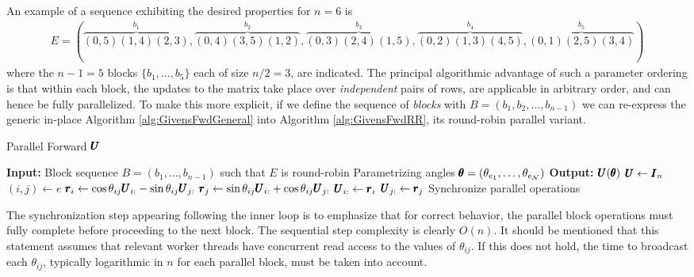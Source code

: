 \documentclass[superscriptaddress,floatfix]{article}
\begin{document}
An example of a sequence exhibiting the desired properties for $n=6$ is
\begin{align}
  E = ( \overbrace{ (0,5) (1,4) (2,3) }^{b_1}, \overbrace{ (0,4) (3,5) (1,2)}^{b_2}, \overbrace{ (0,3) (2,4) (1,5) }^{b_3}, \overbrace{ (0,2) (1,3) (4,5) }^{b_4},
  \overbrace{ (0,1) (2,5) (3,4) }^{b_5} )
  \label{eq:exampleRRSeq}
\end{align}
where the $n-1=5$ blocks $\{ b_1, \ldots, b_5 \}$ each of size
$n/2=3$, are indicated. The principal algorithmic advantage of such a
parameter ordering is that within each block, the updates to the
matrix take place over \emph{independent} pairs of rows, are
applicable in arbitrary order, and can hence be fully parallelized. To
make this more explicit, if we define the sequence of \emph{blocks}
with $B = (b_1, b_2, \ldots, b_{n-1} )$ we can re-express the generic
in-place Algorithm \ref{alg:GivensFwdGeneral} into Algorithm
\ref{alg:GivensFwdRR}, its round-robin parallel variant.
\begin{algorithm}[H]
  \caption{Parallel Forward ${\pmb{U}}$}
  \label{alg:GivensFwdRR}
  \begin{algorithmic}[0] %
    \State \textbf{Input:}
    \State \hspace*{\algorithmicindent} Block sequence $B = ( b_1,
    \ldots, b_{n-1})$ such that $E$ is round-robin
    \State \hspace*{\algorithmicindent} Parametrizing angles ${\pmb{\theta}} = (\theta_{e_1}, \ldots, \theta_{e_{\mathcal{N}}})$
    \State \textbf{Output:}
    \State \hspace*{\algorithmicindent} ${\pmb{U}}({\pmb{\theta}})$
    \State ${\pmb{U}} \gets {\pmb{I}}_n$
       
        \State $(i,j) \gets e$
        \State ${\pmb{r}}_i \gets \cos\theta_{ij}{\pmb{U}}_{i:} -
        \sin\theta_{ij}{\pmb{U}}_{j:}$
        \State ${\pmb{r}}_j \gets \sin\theta_{ij}{\pmb{U}}_{i:} +
        \cos\theta_{ij}{\pmb{U}}_{j:}$
        \State ${\pmb{U}}_{i:} \gets {\pmb{r}}_i$
        \State ${\pmb{U}}_{j:} \gets {\pmb{r}}_j$
      \EndFor
      \State Synchronize parallel operations
    \EndFor
  \end{algorithmic}
\end{algorithm}
The synchronization step appearing following the inner loop is to
emphasize that for correct behavior, the parallel block operations
must fully complete before proceeding to the next block. The
sequential step complexity is clearly $O(n)$. It should be mentioned
that this statement assumes that relevant worker threads have
concurrent read access to the values of $\theta_{ij}$. If this does
not hold, the time to broadcast each $\theta_{ij}$, typically
logarithmic in $n$ for each parallel block, must be taken into
account.
\end{document}
